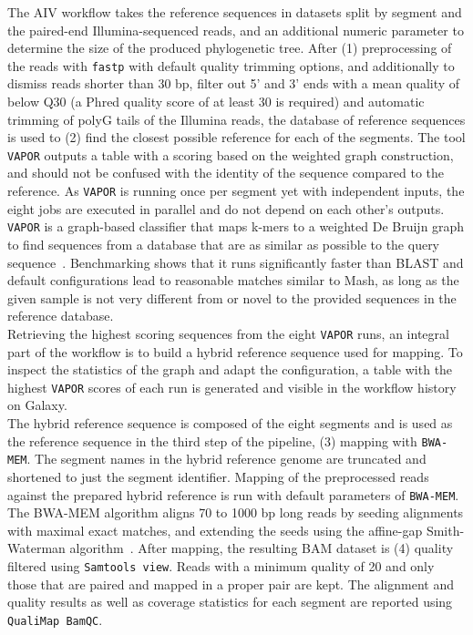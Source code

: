 The \ac{AIV} workflow takes the reference sequences in datasets split by segment and the paired-end Illumina-sequenced reads, and an additional numeric parameter to determine the size of the produced phylogenetic tree. After (1) preprocessing of the reads with \texttt{fastp} with default quality trimming options, and additionally to dismiss reads shorter than 30 bp, filter out 5' and 3' ends with a mean quality of below Q30 (a Phred quality score of at least 30 is required) and automatic trimming of polyG tails of the Illumina reads, the database of reference sequences is used to (2) find the closest possible reference for each of the segments. The tool \texttt{VAPOR} outputs a table with a scoring based on the weighted graph construction, and should not be confused with the identity of the sequence compared to the reference. As \texttt{VAPOR} is running once per segment yet with independent inputs, the eight jobs are executed in parallel and do not depend on each other's outputs. \texttt{VAPOR} is a graph-based classifier that maps k-mers to a weighted De Bruijn graph to find sequences from a database that are as similar as possible to the query sequence~\cite{southgate2020influenza}. Benchmarking shows that it runs significantly faster than \ac{BLAST} and default configurations lead to reasonable matches similar to Mash, as long as the given sample is not very different from or novel to the provided sequences in the reference database. \\
Retrieving the highest scoring sequences from the eight \texttt{VAPOR} runs, an integral part of the workflow is to build a hybrid reference sequence used for mapping. To inspect the statistics of the graph and adapt the configuration, a table with the highest \texttt{VAPOR} scores of each run is generated and visible in the workflow history on Galaxy. \\
The hybrid reference sequence is composed of the eight segments and is used as the reference sequence in the third step of the pipeline, (3) mapping with \texttt{BWA-MEM}. The segment names in the hybrid reference genome are truncated and shortened to just the segment identifier. Mapping of the preprocessed reads against the prepared hybrid reference is run with default parameters of \texttt{BWA-MEM}. The \ac{BWA-MEM} algorithm aligns 70 to 1000 bp long reads by seeding alignments with maximal exact matches, and extending the seeds using the affine-gap Smith-Waterman algorithm~\cite{li2013aligning}. After mapping, the resulting \ac{BAM} dataset is (4) quality filtered using \texttt{Samtools view}. Reads with a minimum quality of 20 and only those that are paired and mapped in a proper pair are kept. The alignment and quality results as well as coverage statistics for each segment are reported using \texttt{QualiMap BamQC}. \\
